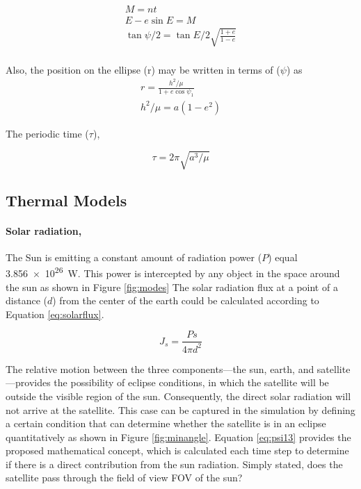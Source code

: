 \documentclass[11pt]{article}
\begin{document}
\begin{gather}\label{eq:12}
    M = n t \\
    E-e\sin{E} = M \\
    \tan{\psi/2} = \tan{E/2}\sqrt{\frac{1+e}{1-e}} \\
\end{gather}

Also, the position on the ellipse (r) may be written in terms of ($\psi$) as
\begin{gather}\label{eq:14}
    r = \frac{h^2/\mu}{1+e\cos{\psi_1}}\\
    h^2/\mu = a(1-e^2)
\end{gather}

The periodic time ($\tau$),
 
\begin{equation}
    \tau = 2\pi\sqrt{a^3/\mu}
\end{equation}



\subsection{Thermal Models}
\paragraph{Solar radiation,} The Sun is emitting a constant amount of radiation power ($P$) equal \SI{3.856e26}{\watt}. This power is intercepted by any object in the space around the sun as shown in Figure \ref{fig:modes} The solar radiation flux at a point of a distance ($d$) from the center of the earth could be calculated according to Equation \ref{eq:solarflux}.

\begin{equation} \label{eq:solarflux}
    J_s = \frac{Ps}{4\pi d^2}
\end{equation}





The relative motion between the three components—the sun, earth, and satellite—provides the possibility of eclipse conditions, in which the satellite will be outside the visible region of the sun. Consequently, the direct solar radiation will not arrive at the satellite. This case can be captured in the simulation by defining a certain condition that can determine whether the satellite is in an eclipse quantitatively as shown in Figure \ref{fig:minangle}. Equation \ref{eq:psi13} provides the proposed mathematical concept, which is calculated each time step to determine if there is a direct contribution from the sun radiation. Simply stated, does the satellite pass through the field of view \ac{FOV} of the sun?
\end{document}

